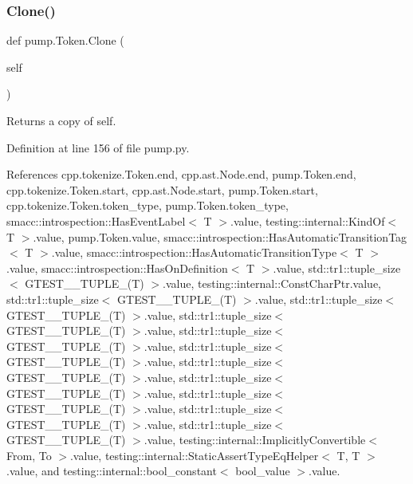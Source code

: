\mbox{\label{classpump_1_1Token_abc0f2d2a0bcad953f5fc85a4e52076eb}} 
\subsubsection{\texorpdfstring{Clone()}{Clone()}}
{\footnotesize\ttfamily def pump.\+Token.\+Clone (\begin{DoxyParamCaption}\item[{}]{self }\end{DoxyParamCaption})}

\begin{DoxyVerb}Returns a copy of self.\end{DoxyVerb}
 

Definition at line 156 of file pump.\+py.



References cpp.\+tokenize.\+Token.\+end, cpp.\+ast.\+Node.\+end, pump.\+Token.\+end, cpp.\+tokenize.\+Token.\+start, cpp.\+ast.\+Node.\+start, pump.\+Token.\+start, cpp.\+tokenize.\+Token.\+token\+\_\+type, pump.\+Token.\+token\+\_\+type, smacc\+::introspection\+::\+Has\+Event\+Label$<$ T $>$.\+value, testing\+::internal\+::\+Kind\+Of$<$ T $>$.\+value, pump.\+Token.\+value, smacc\+::introspection\+::\+Has\+Automatic\+Transition\+Tag$<$ T $>$.\+value, smacc\+::introspection\+::\+Has\+Automatic\+Transition\+Type$<$ T $>$.\+value, smacc\+::introspection\+::\+Has\+On\+Definition$<$ T $>$.\+value, std\+::tr1\+::tuple\+\_\+size$<$ G\+T\+E\+S\+T\+\_\+\_\+\+T\+U\+P\+L\+E\+\_\+(\+T) $>$.\+value, testing\+::internal\+::\+Const\+Char\+Ptr.\+value, std\+::tr1\+::tuple\+\_\+size$<$ G\+T\+E\+S\+T\+\_\+\_\+\+T\+U\+P\+L\+E\+\_\+(\+T) $>$.\+value, std\+::tr1\+::tuple\+\_\+size$<$ G\+T\+E\+S\+T\+\_\+\_\+\+T\+U\+P\+L\+E\+\_\+(\+T) $>$.\+value, std\+::tr1\+::tuple\+\_\+size$<$ G\+T\+E\+S\+T\+\_\+\_\+\+T\+U\+P\+L\+E\+\_\+(\+T) $>$.\+value, std\+::tr1\+::tuple\+\_\+size$<$ G\+T\+E\+S\+T\+\_\+\_\+\+T\+U\+P\+L\+E\+\_\+(\+T) $>$.\+value, std\+::tr1\+::tuple\+\_\+size$<$ G\+T\+E\+S\+T\+\_\+\_\+\+T\+U\+P\+L\+E\+\_\+(\+T) $>$.\+value, std\+::tr1\+::tuple\+\_\+size$<$ G\+T\+E\+S\+T\+\_\+\_\+\+T\+U\+P\+L\+E\+\_\+(\+T) $>$.\+value, std\+::tr1\+::tuple\+\_\+size$<$ G\+T\+E\+S\+T\+\_\+\_\+\+T\+U\+P\+L\+E\+\_\+(\+T) $>$.\+value, std\+::tr1\+::tuple\+\_\+size$<$ G\+T\+E\+S\+T\+\_\+\_\+\+T\+U\+P\+L\+E\+\_\+(\+T) $>$.\+value, std\+::tr1\+::tuple\+\_\+size$<$ G\+T\+E\+S\+T\+\_\+\_\+\+T\+U\+P\+L\+E\+\_\+(\+T) $>$.\+value, std\+::tr1\+::tuple\+\_\+size$<$ G\+T\+E\+S\+T\+\_\+\_\+\+T\+U\+P\+L\+E\+\_\+(\+T) $>$.\+value, testing\+::internal\+::\+Implicitly\+Convertible$<$ From, To $>$.\+value, testing\+::internal\+::\+Static\+Assert\+Type\+Eq\+Helper$<$ T, T $>$.\+value, and testing\+::internal\+::bool\+\_\+constant$<$ bool\+\_\+value $>$.\+value.


